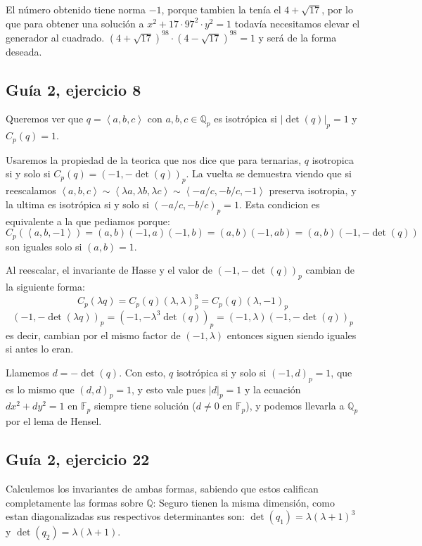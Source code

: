 \documentclass[12pt]{amsart}
\newcommand{\QQ}{\mathbb{Q}}
\newcommand{\FF}{\mathbb{F}}
\newcommand{\lc}{\left<}
\newcommand{\rc}{\right>}
\theoremstyle{plain}
\begin{document}
El número obtenido tiene norma $-1$, porque tambien la tenía el 
$4+\sqrt{17}$, por lo que para obtener una solución a 
$x^2+17\cdot97^2\cdot y^2 = 1$ todavía necesitamos elevar el generador
al cuadrado. 
\hyperref[solucion25]{$(4+\sqrt{17})^{98}\cdot(4-\sqrt{17})^{98} = 1$} 
y será de la forma deseada.

\subsection*{Guía 2, ejercicio 8}

Queremos ver que $q = \lc a,b,c\rc $ con $a,b,c \in \QQ_p$ es 
isotrópica si $|\det (q)|_p =1$ y $C_p(q) = 1$.



Usaremos la propiedad de la teorica que nos dice que para ternarias,
$q$ isotropica si y solo si $C_p(q)=(-1,-\det (q))_p$. La vuelta se 
demuestra viendo que si reescalamos $\lc a,b,c\rc \sim \lc\lambda a,
\lambda b,\lambda c\rc \sim \lc-a/c,-b/c,-1\rc$ preserva isotropia, 
y la ultima es isotrópica si y solo si $(-a/c,-b/c)_p = 1$. 
Esta condicion es equivalente a la que pediamos porque:
$$C_p(\lc a,b,-1\rc) = (a,b)(-1,a)(-1,b)=(a,b)(-1,ab)=(a,b)
(-1,-\det(q))$$
son iguales solo si $(a,b)=1$.

Al reescalar, el invariante de Hasse y el valor de $(-1,-\det(q))_p$ 
cambian de la siguiente forma:
$$C_p(\lambda q) = C_p(q) (\lambda,\lambda)_p^3 = C_p(q) 
(\lambda, -1)_p$$
$$(-1,-\det(\lambda q))_p = (-1,-\lambda^3\det(q))_p=
(-1,\lambda)(-1,-\det(q))_p$$
es decir, cambian por el mismo factor de $(-1,\lambda)$ entonces siguen
siendo iguales si antes lo eran.

Llamemos $d = -\det (q)$. Con esto, $q$ isotrópica si y solo si 
$(-1,d)_p =1$, que es lo mismo que $(d,d)_p =1$, y esto vale
pues $|d|_p =1$ y la ecuación $d x^2 + d y^2 = 1$ en 
$\FF_p$ siempre tiene solución ($d\neq 0$ en $\FF_p$), y
podemos llevarla a $\QQ_p$ por el lema de Hensel.

\subsection*{Guía 2, ejercicio 22}

Calculemos los invariantes de ambas formas, sabiendo que estos 
califican completamente las formas sobre $\QQ$: Seguro tienen 
la misma dimensión, como estan diagonalizadas sus respectivos
determinantes son: $\det(q_1) =\lambda (\lambda+1)^3$ y 
$\det(q_2)= \lambda (\lambda+1)$.
\end{document}
